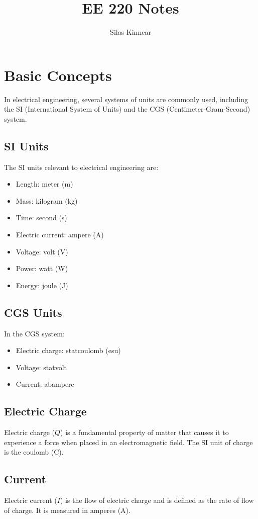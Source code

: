 \documentclass[openany]{book}
\title{EE 220 Notes}
\author{Silas Kinnear}
\date{}
\begin{document}
\maketitle
\tableofcontents
\chapter{Basic Concepts}
In electrical engineering, several systems of units are commonly used, including the SI (International System of Units) and the CGS (Centimeter-Gram-Second) system.

\section{SI Units}
The SI units relevant to electrical engineering are:
\begin{itemize}
    \item Length: meter (m)
    \item Mass: kilogram (kg)
    \item Time: second (s)
    \item Electric current: ampere (A)
    \item Voltage: volt (V)
    \item Power: watt (W)
    \item Energy: joule (J)
\end{itemize}

\section{CGS Units}
In the CGS system:
\begin{itemize}
    \item Electric charge: statcoulomb (esu)
    \item Voltage: statvolt
    \item Current: abampere
\end{itemize}

\section{Electric Charge}
Electric charge ($Q$) is a fundamental property of matter that causes it to experience a force when placed in an electromagnetic field. The SI unit of charge is the coulomb (C).

\section{Current}
Electric current ($I$) is the flow of electric charge and is defined as the rate of flow of charge. It is measured in amperes (A).
\end{document}
